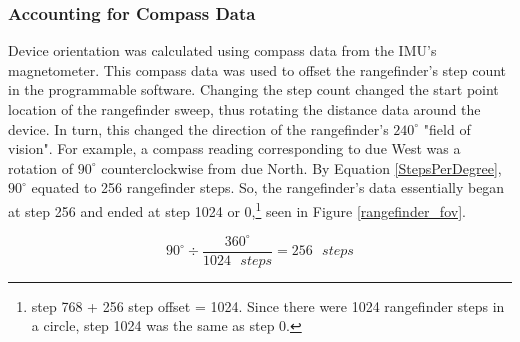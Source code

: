 \subsubsection{Accounting for Compass Data}
Device orientation was calculated using compass data from the IMU's magnetometer. This compass data was used to offset the rangefinder's step count in the programmable software. Changing the step count changed the start point location of the rangefinder sweep, thus rotating the distance data around the device. In turn, this changed the direction of the rangefinder's $240^\circ$ "field of vision". For example, a compass reading corresponding to due West was a rotation of $90^\circ$ counterclockwise from due North. By Equation \ref{StepsPerDegree}, $90^\circ$ equated to 256 rangefinder steps. So, the rangefinder's data essentially began at step 256 and ended at step 1024 or 0,\footnote{ step 768 + 256 step offset = 1024. Since there were 1024 rangefinder steps in a circle, step 1024 was the same as step 0.} seen in Figure \ref{rangefinder_fov}.

\begin{equation}
	90^\circ \div \dfrac{360^\circ}{1024 \textrm{ } steps}  = 256 \textrm{ } steps
	\label{StepsPerDegree}
\end{equation}



